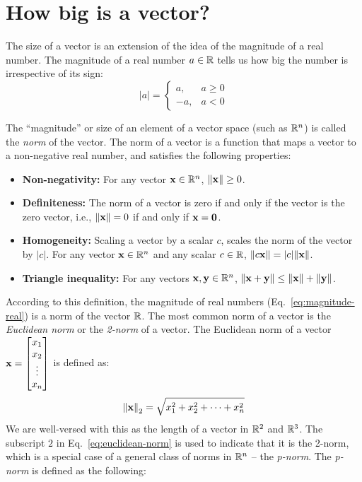 \section{How big is a vector?}
The size of a vector is an extension of the idea of the magnitude of a real number. The magnitude of a real number $a \in \mathbb{R}$ tells us how big the number is irrespective of its sign:
\begin{equation}
    \vert a \vert = \begin{cases} a, & a \geq 0 \\ -a, & a < 0 \end{cases}
    \label{eq:magnitude-real}
\end{equation}

The ``magnitude'' or size of an element of a vector space (such as $\mathbb{R}^n$) is called the \textit{norm} of the vector. The norm of a vector is a function that maps a vector to a non-negative real number, and satisfies the following properties:
\begin{itemize}
    \item \textbf{Non-negativity:} For any vector $\mathbf{x} \in \mathbb{R}^n$, $\norm{\mathbf{x}} \geq 0$.
    \item \textbf{Definiteness:} The norm of a vector is zero if and only if the vector is the zero vector, i.e., $\norm{\mathbf{x}} = 0$ if and only if $\mathbf{x} = \mathbf{0}$.
    \item \textbf{Homogeneity:} Scaling a vector by a scalar $c$, scales the norm of the vector by $\vert c \vert$. For any vector $\mathbf{x} \in \mathbb{R}^n$ and any scalar $c \in \mathbb{R}$, $\norm{c\mathbf{x}} = \vert c \vert \norm{\mathbf{x}}$.
    \item \textbf{Triangle inequality:} For any vectors $\mathbf{x}, \mathbf{y} \in \mathbb{R}^n$, $\norm{\mathbf{x} + \mathbf{y}} \leq \norm{\mathbf{x}} + \norm{\mathbf{y}}$.
\end{itemize}
According to this definition, the magnitude of real numbers (Eq.~\ref{eq:magnitude-real}) is a norm of the vector $\mathbb{R}$. The most common norm of a vector is the \textit{Euclidean norm} or the \textit{2-norm} of a vector. The Euclidean norm of a vector $\mf{x} = \bmxc x_1 \\ x_2 \\ \vdots \\ x_n \emx$ is defined as:
\begin{equation}
    \norm{\mathbf{x}}_2 = \sqrt{x_1^2 + x_2^2 + \cdots + x_n^2}
    \label{eq:euclidean-norm}
\end{equation}
We are well-versed with this as the length of a vector in $\mathbb{R}^2$ and $\mathbb{R}^3$. The subscript $2$ in Eq.~\ref{eq:euclidean-norm} is used to indicate that it is the 2-norm, which is a special case of a general class of norms in $\mathbb{R}^n$ -- the \textit{p-norm}. The \textit{p-norm} is defined as the following:

